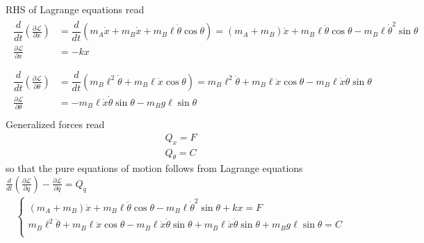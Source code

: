 \documentclass[letterpaper,10pt,english]{jupyterBook}
\begin{document}
\sphinxAtStartPar
{} RHS of Lagrange equations read
\begin{equation*}
\begin{split}\begin{aligned}
  \dfrac{d}{dt}\left( \frac{\partial \mathscr{L}}{\partial \dot{x}} \right) & = \dfrac{d}{dt} \left( m_A \dot{x} + m_B \dot{x} + m_B \ell \dot{\theta} \cos \theta \right) = \left( m_A + m_B \right) \ddot{x} + m_B \ell \ddot{\theta} \cos \theta - m_B \ell \dot{\theta}^2 \sin \theta \\
                      \frac{\partial \mathscr{L}}{\partial      x }         & = -k x \\
\end{aligned}\end{split}
\end{equation*}\begin{equation*}
\begin{split}\begin{aligned}
  \dfrac{d}{dt}\left( \frac{\partial \mathscr{L}}{\partial \dot{\theta}} \right) & = \dfrac{d}{dt} \left( m_B \ell^2 \dot{\theta} + m_B \ell \dot{x} \cos \theta \right) = m_B \ell^2 \ddot{\theta} + m_B \ell \ddot{x} \cos \theta - m_B \ell \dot{x} \dot{\theta} \sin \theta  \\
                      \frac{\partial \mathscr{L}}{\partial      \theta }         & = - m_B \ell \dot{x} \dot{\theta} \sin \theta - m_B g \ell \sin \theta  \\
\end{aligned}\end{split}
\end{equation*}
\sphinxAtStartPar
Generalized forces read
\begin{equation*}
\begin{split}Q_x = F\end{split}
\end{equation*}\begin{equation*}
\begin{split}Q_\theta = C\end{split}
\end{equation*}
\sphinxAtStartPar
so that the pure equations of motion follows from Lagrange equations \(\frac{d}{dt} \left( \frac{\partial \mathscr{L}}{\partial \dot{q}} \right) - \frac{\partial \mathscr{L}}{\partial q} = Q_q\)
\begin{equation*}
\begin{split}\begin{cases}
  \left( m_A + m_B \right) \ddot{x} + m_B \ell \ddot{\theta} \cos \theta - m_B \ell \dot{\theta}^2 \sin \theta + k x = F \\ 
  m_B \ell^2 \ddot{\theta} + m_B \ell \ddot{x} \cos \theta - m_B \ell \dot{x} \dot{\theta} \sin \theta + m_B \ell \dot{x} \dot{\theta} \sin \theta + m_B g \ell \sin \theta = C \\ 
\end{cases}\end{split}
\end{equation*}
\end{document}
